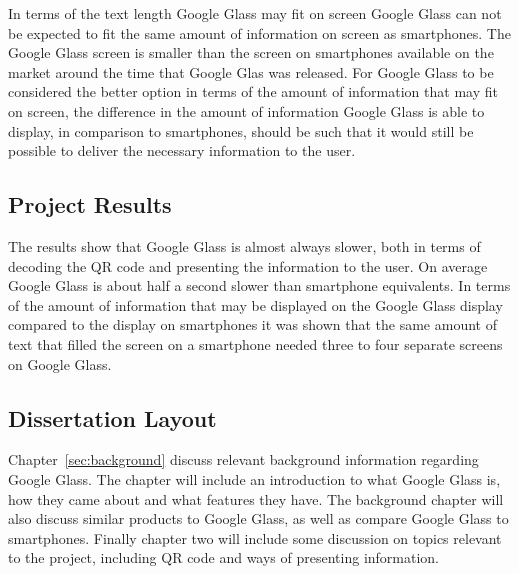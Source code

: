 
In terms of the text length Google Glass may fit on screen Google Glass can not be expected to fit the same amount of information on screen as smartphones. The Google Glass screen is smaller than the screen on smartphones available on the market around the time that Google Glas was released. For Google Glass to be considered the better option in terms of the amount of information that may fit on screen, the difference in the amount of information Google Glass is able to display, in comparison to smartphones, should be such that it would still be possible to deliver the necessary information to the user.

\subsection{Project Results}
The results show that Google Glass is almost always slower, both in terms of decoding the QR code and presenting the information to the user. On average Google Glass is about half a second slower than smartphone equivalents. In terms of the amount of information that may be displayed on the Google Glass display compared to the display on smartphones it was shown that the same amount of text that filled the screen on a smartphone needed three to four separate screens on Google Glass.

\subsection{Dissertation Layout}
Chapter~\ref{sec:background} discuss relevant background information regarding Google Glass. The chapter will include an introduction to what Google Glass is, how they came about and what features they have. The background chapter will also discuss similar products to Google Glass, as well as compare Google Glass to smartphones. Finally chapter two will include some discussion on topics relevant to the project, including QR code and ways of presenting information.

